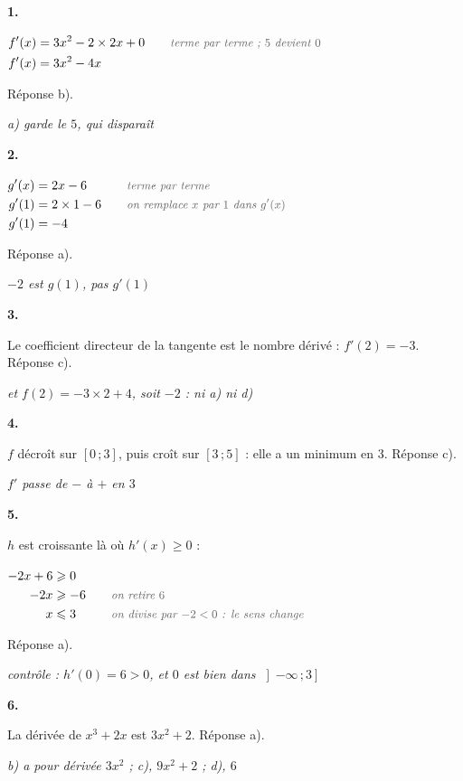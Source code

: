 \documentclass[11pt,a4paper]{article}
\makeatletter
\renewcommand{\le}{\leqslant}
\renewcommand{\ge}{\geqslant}
\newcommand{\lycee@intff}[2]{\left[#1\,;#2\right]}
\providecommand{\intff}{\lycee@intff}%
\newcounter{exo}
\newenvironment{exo}[1][\relax]{\refstepcounter{exo}\begin{exercice}[#1]}{\end{exercice}}
\newcommand{\res}[1]{{\color{coulRep}#1}}
\newenvironment{calculs}{\par\smallskip\noindent$\displaystyle\begin{aligned}[t]}%
  {\end{aligned}$\par\smallskip}
\newcommand{\justif}[1]{\quad\text{\small\itshape\color{black!60}#1}}
\newcommand{\cas}[1]{\par\smallskip\noindent\textbf{\color{coulExo}#1}\vadjust{\nobreak}}
\newcommand{\explique}[2]{\par\smallskip\noindent
  \begin{minipage}[t]{0.6\linewidth}\raggedright #1\end{minipage}\hfill
  \begin{minipage}[t]{0.37\linewidth}\raggedright\leavevmode
    {\small\itshape\color{black!60}#2}\end{minipage}\par}
\let\casligne\cas
\renewcommand{\cas}[1]{\casligne{#1}\par\nopagebreak}
\makeatother
\begin{document}
\begin{exo}[QCM]
\cas{1.}
\begin{calculs}
f'(x) &= 3x^{2}-2\times 2x+0 &&\justif{terme par terme ; $5$ devient $0$}\\
f'(x) &= 3x^{2}-4x &&
\end{calculs}
\explique{Réponse \res{b)}.}{a) garde le $5$, qui disparaît}
\cas{2.}
\begin{calculs}
g'(x) &= 2x-6 &&\justif{terme par terme}\\
g'(1) &= 2\times 1-6 &&\justif{on remplace $x$ par $1$ dans $g'(x)$}\\
g'(1) &= -4 &&
\end{calculs}
\explique{Réponse \res{a)}.}{$-2$ est $g(1)$, pas $g'(1)$}
\cas{3.}
\explique{Le coefficient directeur de la tangente est le nombre dérivé : $f'(2)=-3$.
Réponse \res{c)}.}{et $f(2)=-3\times 2+4$, soit $-2$ : ni a) ni d)}
\cas{4.}
\explique{$f$ décroît sur $\intff{0}{3}$, puis croît sur $\intff{3}{5}$ : elle a un
minimum en $3$. Réponse \res{c)}.}{$f'$ passe de $-$ à $+$ en $3$}
\cas{5.}
\explique{$h$ est croissante là où $h'(x)\ge 0$ :}{}\nopagebreak
\begin{calculs}
-2x+6 &\ge 0 &&\\
-2x &\ge -6 &&\justif{on retire $6$}\\
x &\le 3 &&\justif{on divise par $-2<0$ : le sens change}
\end{calculs}
\explique{Réponse \res{a)}.}{contrôle : $h'(0)=6>0$, et $0$ est bien dans $\left]-\infty\,;3\right]$}
\cas{6.}
\explique{La dérivée de $x^{3}+2x$ est $3x^{2}+2$. Réponse \res{a)}.}{b) a pour dérivée
$3x^{2}$ ; c), $9x^{2}+2$ ; d), $6$}
\end{exo}
\end{document}
